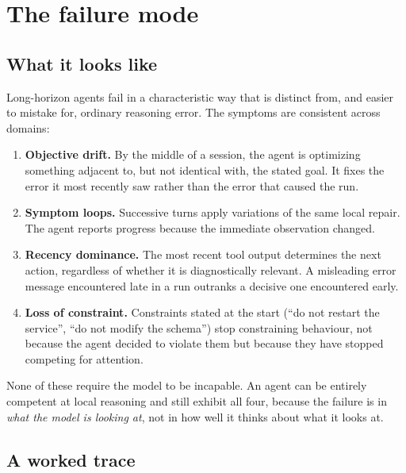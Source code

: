 \documentclass[11pt,a4paper]{article}
\theoremstyle{plain}
\theoremstyle{definition}
\theoremstyle{remark}
\begin{document}
\section{The failure mode}
\label{sec:phenomenon}

\subsection{What it looks like}

Long-horizon agents fail in a characteristic way that is distinct from, and
easier to mistake for, ordinary reasoning error. The symptoms are consistent
across domains:

\begin{enumerate}[label=(\alph*), leftmargin=*]
  \item \textbf{Objective drift.} By the middle of a session, the agent is
        optimizing something adjacent to, but not identical with, the stated
        goal. It fixes the error it most recently saw rather than the error that
        caused the run.
  \item \textbf{Symptom loops.} Successive turns apply variations of the same
        local repair. The agent reports progress because the immediate
        observation changed.
  \item \textbf{Recency dominance.} The most recent tool output determines the
        next action, regardless of whether it is diagnostically relevant. A
        misleading error message encountered late in a run outranks a decisive
        one encountered early.
  \item \textbf{Loss of constraint.} Constraints stated at the start
        (``do not restart the service'', ``do not modify the schema'') stop
        constraining behaviour, not because the agent decided to violate them
        but because they have stopped competing for attention.
\end{enumerate}

None of these require the model to be incapable. An agent can be entirely
competent at local reasoning and still exhibit all four, because the failure is
in \emph{what the model is looking at}, not in how well it thinks about what it
looks at.

\subsection{A worked trace}
\end{document}
